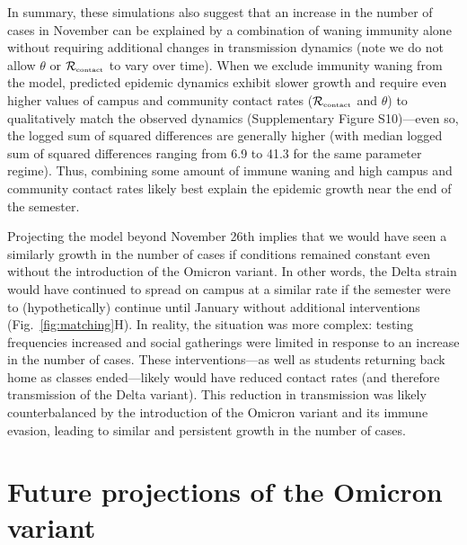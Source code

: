 \documentclass[12pt]{article}
\newcommand{\fref}[1]{Fig.~\ref{fig:#1}}
\newcommand{\Rx}[1]{\ensuremath{{\mathcal R}_{#1}}}
\newcommand{\Rc}{\Rx{\textrm{\tiny{contact}}}}
\begin{document}
In summary, these simulations also suggest that an increase in the number of cases in November can be explained by a combination of waning immunity alone without requiring additional changes in transmission dynamics (note we do not allow $\theta$ or $\Rc$ to vary over time).
When we exclude immunity waning from the model, predicted epidemic dynamics exhibit slower growth and require even higher values of campus and community contact rates ($\Rc$ and $\theta$) to qualitatively match the observed dynamics (Supplementary Figure S10)---even so, the logged sum of squared differences are generally higher (with median logged sum of squared differences ranging from 6.9 to 41.3 for the same parameter regime).
Thus, combining some amount of immune waning and high campus and community contact rates likely best explain the epidemic growth near the end of the semester.

Projecting the model beyond November 26th implies that we would have seen a similarly growth in the number of cases if conditions remained constant even without the introduction of the Omicron variant.
In other words, the Delta strain would have continued to spread on campus at a similar rate if the semester were to (hypothetically) continue until January without additional interventions (\fref{matching}H).
In reality, the situation was more complex: testing frequencies increased and social gatherings were limited in response to an increase in the number of cases.
These interventions---as well as students returning back home as classes ended---likely would have reduced contact rates (and therefore transmission of the Delta variant).
This reduction in transmission was likely counterbalanced by the introduction of the Omicron variant and its immune evasion, leading to similar and persistent growth in the number of cases.

\section*{Future projections of the Omicron variant}
\end{document}
